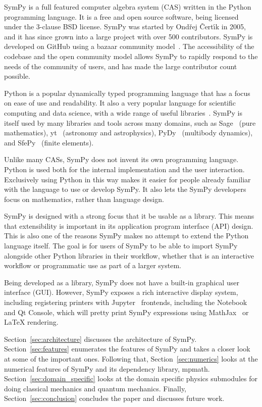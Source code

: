 SymPy is a full featured computer algebra system (CAS) written in the Python
programming language.
It is a free and open source software, being licensed under the 3-clause BSD
license.
SymPy was started by Ond\v{r}ej \v{C}ert\'{\i}k in 2005, and it has since
grown into a large project with over 500 contributors. SymPy is
developed on GitHub using a bazaar community
model~\cite{raymond1999cathedral}. The accessibility of the codebase and the
open community model allows SymPy to rapidly respond to the needs of the
community of users, and has made the large contributor count possible.

Python is a popular dynamically typed programming language that has a focus on
ease of use and readability. It also a very popular language for scientific
computing and data science, with a wide range of useful
libraries~\cite{oliphant2007python}. SymPy is itself used by many libraries
and tools across many domains, such as Sage~\cite{SAGE} (pure mathematics),
yt~\cite{2011ApJS..192....9T} (astronomy and astrophysics),
PyDy~\cite{gede2013constrained} (multibody dynamics), and
SfePy~\cite{cimrman2014sfepy} (finite elements).

Unlike many CASs, SymPy does not invent its own programming language. Python
is used both for the internal implementation and the user interaction.
Exclusively using Python in this way makes it easier for people already
familiar with the language to use or develop SymPy. It also lets the SymPy
developers focus on mathematics, rather than language design.

SymPy is designed with a strong focus that it be usable as a library. This
means that extensibility is important in its application program interface
(API) design. This is also one of the reasons SymPy makes no attempt to extend
the Python language itself. The goal is for users of SymPy to be able to
import SymPy alongside other Python libraries in their workflow, whether that
is an interactive workflow or programmatic use as part of a larger system.

Being developed as a library, SymPy does not have a built-in graphical user
interface (GUI). However, SymPy exposes a rich interactive display system,
including registering printers with Jupyter~\cite{perez2007ipython} frontends,
including the Notebook and Qt Console, which will pretty print SymPy
expressions using MathJax~\cite{cervone2012mathjax} or \LaTeX{} rendering.

Section~\ref{sec:architecture} discusses the architecture of SymPy.
Section~\ref{sec:features} enumerates the features of SymPy and takes a closer
look at some of the important ones. Following that, Section~\ref{sec:numerics}
looks at the numerical features of SymPy and its dependency library, mpmath.
Section~\ref{sec:domain_specific} looks at the domain specific physics
submodules for doing classical mechanics and quantum mechanics. Finally,
Section~\ref{sec:conclusion} concludes the paper and discusses future work.
